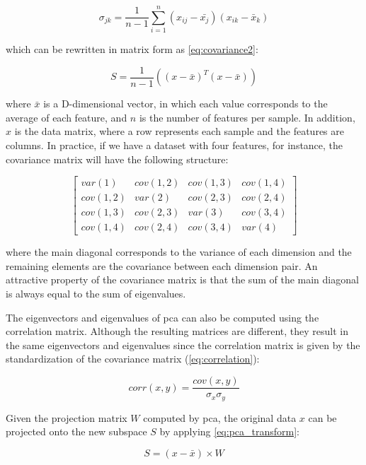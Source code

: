 \begin{equation}
\label{eq:covariance}
\sigma_{jk} = \frac{1}{n-1}\sum_{i=1}^{n}(x_{ij} - \bar{x_j})(x_{ik} - \bar{x}_k)
\end{equation}

\noindent
which can be rewritten in matrix form as \autoref{eq:covariance2}:

\begin{equation}
\label{eq:covariance2}
S = \frac{1}{n-1}((x - \bar{x})^T(x - \bar{x}))
\end{equation}

\noindent
where $\bar{x}$ is a D-dimensional vector, in which each value corresponds to the average of each feature, and $n$ is the number of features per sample. In addition, $x$ is the data matrix, where a row represents each sample and the features are columns. In practice, if we have a dataset with four features, for instance, the covariance matrix will have the following structure:

$$
\begin{bmatrix}var(1) & cov(1,2) & cov(1,3) & cov(1,4) 
\\ cov(1,2) & var(2) & cov(2,3) & cov(2,4)
\\ cov(1,3) & cov(2,3) & var(3) & cov(3,4)
\\ cov(1,4) & cov(2,4) & cov(3,4) & var(4)
\end{bmatrix}
$$

\noindent
where the main diagonal corresponds to the variance of each dimension and the remaining elements are the covariance between each dimension pair. An attractive property of the covariance matrix is that the sum of the main diagonal is always equal to the sum of eigenvalues.

The eigenvectors and eigenvalues of \acs{pca} can also be computed using the correlation matrix. Although the resulting matrices are different, they result in the same eigenvectors and eigenvalues since the correlation matrix is given by the standardization of the covariance matrix (\autoref{eq:correlation}):

\begin{equation}
\label{eq:correlation}
corr(x,y) = \frac{cov(x,y)}{\sigma_x \sigma_y}
\end{equation}

Given the projection matrix $W$ computed by \acs{pca}, the original data $x$ can be projected onto the new subspace $S$ by applying \autoref{eq:pca_transform}:

\begin{equation}
\label{eq:pca_transform}
S = (x-\bar{x}) \times W
\end{equation}


